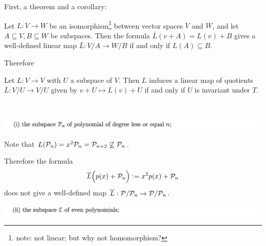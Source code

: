 \documentclass[12pt]{article}
\begin{document}
First, a theorem and a corollary:

\begin{theorem*}
  Let $L:V \to W$ be an isomorphism\footnote{note: not linear; but why not homomorphism?} between
  vector spaces $V$ and $W$, and let $A \subseteq V, B \subseteq W$ be subspaces. Then the formula
  $\bar L(v + A) = L(v) + B$ gives a well-defined linear map $\bar L:V/A \to W/B$ if and only if
  $L(A) \subseteq B$.
\end{theorem*}

Therefore

\begin{corollary*}
  Let $L:V \to V$ with $U$ a subspace of $V$. Then $L$ induces a linear map of quotients
  $\bar L:V/U \to V/U$ given by $v + U \mapsto L(v) + U$ if and only if $U$ is invariant under $T$.
\end{corollary*}

~\\

\begin{mdframed}
  \includegraphics[width=400pt]{img/linear-algebra-a0-2-2-1.png}
\end{mdframed}


Note that $L(\mathcal P_n) = x^2\mathcal P_n = \mathcal P_{n+2} \not\subseteq \mathcal P_n$.

Therefore the formula
\begin{align*}
  \overline L\Big(p(x) + \mathcal P_n\Big) := x^2p(x) + \mathcal P_n
\end{align*}
does not give a well-defined map $\overline L:\mathcal P/\mathcal P_n \to \mathcal P/\mathcal P_n$.

\begin{mdframed}
\includegraphics[width=400pt]{img/linear-algebra-a0-2-2-2.png}
\end{mdframed}

\end{document}
